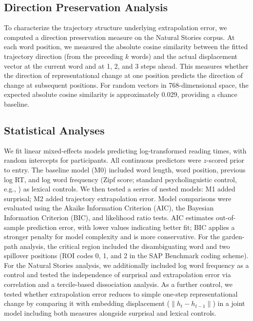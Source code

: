 \documentclass[12pt]{article}
\begin{document}
\subsection{Direction Preservation Analysis}

To characterize the trajectory structure underlying extrapolation error, we computed a direction preservation measure on the Natural Stories corpus. At each word position, we measured the absolute cosine similarity between the fitted trajectory direction (from the preceding $k$ words) and the actual displacement vector at the current word and at 1, 2, and 3 steps ahead. This measures whether the direction of representational change at one position predicts the direction of change at subsequent positions. For random vectors in 768-dimensional space, the expected absolute cosine similarity is approximately 0.029, providing a chance baseline.

\subsection{Statistical Analyses}

We fit linear mixed-effects models predicting log-transformed reading times, with random intercepts for participants. All continuous predictors were $z$-scored prior to entry. The baseline model (M0) included word length, word position, previous log RT, and log word frequency (Zipf score; standard psycholinguistic control, e.g., \citealp{smith2013}) as lexical controls. We then tested a series of nested models: M1 added surprisal; M2 added trajectory extrapolation error. Model comparisons were evaluated using the Akaike Information Criterion (AIC), the Bayesian Information Criterion (BIC), and likelihood ratio tests. AIC estimates out-of-sample prediction error, with lower values indicating better fit; BIC applies a stronger penalty for model complexity and is more conservative. For the garden-path analysis, the critical region included the disambiguating word and two spillover positions (ROI codes 0, 1, and 2 in the SAP Benchmark coding scheme). For the Natural Stories analysis, we additionally included log word frequency as a control and tested the independence of surprisal and extrapolation error via correlation and a tercile-based dissociation analysis. As a further control, we tested whether extrapolation error reduces to simple one-step representational change by comparing it with embedding displacement ($\|h_t - h_{t-1}\|$) in a joint model including both measures alongside surprisal and lexical controls.
\end{document}
